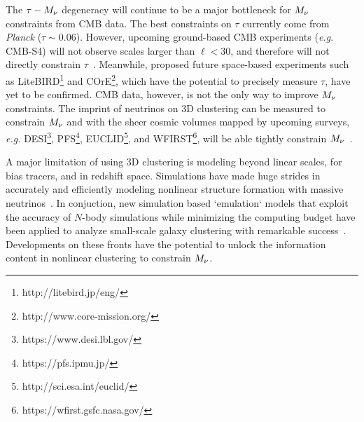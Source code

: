 The $\tau-M_\nu$ degeneracy will continue to be a major bottleneck 
for $M_\nu$ constraints from CMB data. The best constraints on $\tau$ 
currently come from {\em Planck} ($\tau\sim0.06$). However, upcoming 
ground-based CMB experiments ({\em e.g.} CMB-S4) will not observe scales 
larger than $\ell < 30$, and therefore will not directly constrain 
$\tau$~\citep{abazajian2016}. Meanwhile, proposed future space-based 
experiments such as LiteBIRD\footnote{http://litebird.jp/eng/} and 
COrE\footnote{http://www.core-mission.org/}, which have the potential 
to precisely measure $\tau$, have yet to be confirmed. CMB data, however, 
is not the only way to improve $M_\nu$ constraints. The imprint of 
neutrinos on 3D clustering can be measured to constrain $M_\nu$ and 
with the sheer cosmic volumes mapped by upcoming surveys, \emph{e.g.} 
DESI\footnote{https://www.desi.lbl.gov/}, PFS\footnote{https://pfs.ipmu.jp/}, 
EUCLID\footnote{http://sci.esa.int/euclid/}, and WFIRST\footnote{https://wfirst.gsfc.nasa.gov/}, 
will be able tightly constrain $M_\nu$~\citep{audren2013, font-ribera2014, petracca2016, sartoris2016, boyle2018}.

A major limitation of using 3D clustering is modeling beyond linear 
scales, for bias tracers, and in redshift space. Simulations have made
huge strides in accurately and efficiently modeling nonlinear structure
formation with massive neutrinos~\citep[\emph{e.g.}][]{brandbyge2008, 
villaescusa-navarro2013, castorina2015, adamek2017, emberson2017, villaescusa-navarro2018}. 
In conjuction, new simulation based `emulation` models that exploit the 
accuracy of $N$-body simulations while minimizing the computing budget 
have been applied to analyze small-scale galaxy clustering with remarkable 
success~\citep[\emph{e.g.}][]{heitmann2009, kwan2015, euclidcollaboration2018, mcclintock2018, zhai2018, wibking2019}. 
Developments on these fronts have the potential to unlock the information 
content in nonlinear clustering to constrain $M_\nu$. 

